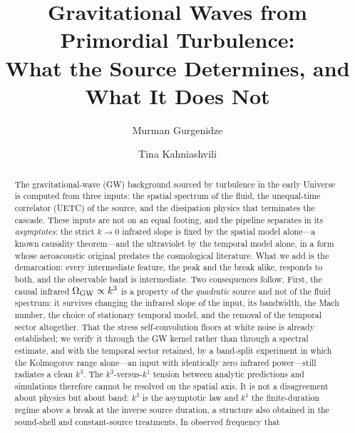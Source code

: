 \documentclass[10pt,prd,aps,nobibnotes,superscriptaddress,preprintnumbers,notitlepage]{revtex4-1}
\begin{document}
\title{Gravitational Waves from Primordial Turbulence:\\
       What the Source Determines, and What It Does Not}

\author{Murman Gurgenidze}

\author{Tina Kahniashvili}
\begin{abstract}
The gravitational-wave (GW) background sourced by turbulence in the early Universe is
computed from three inputs: the spatial spectrum of the fluid, the unequal-time
correlator (UETC) of the source, and the dissipation physics that terminates the
cascade. These inputs are not on an equal footing, and the pipeline separates in its
\emph{asymptotes}: the strict $k\to0$ infrared slope is fixed by the spatial model
alone---a known causality theorem---and the ultraviolet by the temporal model alone, in
a form whose aeroacoustic original predates the cosmological literature. What we add is
the demarcation: every intermediate feature, the peak and the break alike, responds to
both, and the observable band is intermediate. Two
consequences follow. First, the causal infrared $\Omega_{\rm GW}\propto k^{3}$ is a
property of the \emph{quadratic} source and not of the fluid spectrum: it survives
changing the infrared slope of the input, its bandwidth, the Mach number, the choice of
stationary temporal model, and the removal of the temporal sector altogether. That the
stress self-convolution floors at white noise is already established; we verify it
through the GW kernel rather than through a spectral estimate, and with the temporal
sector retained, by a band-split experiment in which the Kolmogorov range
alone---an input with identically zero infrared power---still radiates a clean
$k^{3}$. The $k^{3}$-versus-$k^{1}$ tension between analytic predictions and
simulations therefore cannot be resolved on the spatial axis. It is not a disagreement
about physics but about band: $k^{3}$ is the asymptotic law and $k^{1}$ the
finite-duration regime above a break at the inverse source duration, a structure also
obtained in the sound-shell and constant-source treatments. In observed frequency that

\end{abstract}
\end{document}
